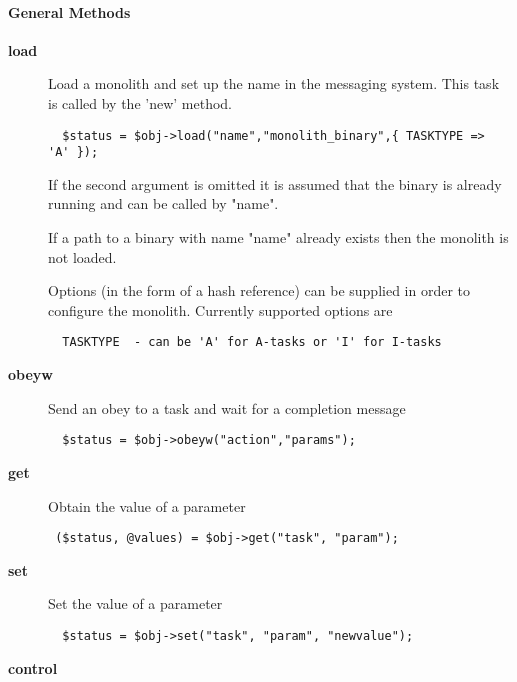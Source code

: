 \paragraph*{General Methods\label{ORAC::Msg::ADAM::Task_General_Methods}}\begin{description}
\item[\textbf{load}] \mbox{}

Load a monolith and set up the name in the messaging system.
This task is called by the 'new' method.

\begin{verbatim}
  $status = $obj->load("name","monolith_binary",{ TASKTYPE => 'A' });
\end{verbatim}


If the second argument is omitted it is assumed that the binary
is already running and can be called by "name".



If a path to a binary with name "name" already exists then the monolith
is not loaded.



Options (in the form of a hash reference) can be supplied
in order to configure the monolith. Currently supported options
are

\begin{verbatim}
  TASKTYPE  - can be 'A' for A-tasks or 'I' for I-tasks
\end{verbatim}
\item[\textbf{obeyw}] \mbox{}

Send an obey to a task and wait for a completion message

\begin{verbatim}
  $status = $obj->obeyw("action","params");
\end{verbatim}
\item[\textbf{get}] \mbox{}

Obtain the value of a parameter

\begin{verbatim}
 ($status, @values) = $obj->get("task", "param");
\end{verbatim}
\item[\textbf{set}] \mbox{}

Set the value of a parameter

\begin{verbatim}
  $status = $obj->set("task", "param", "newvalue");
\end{verbatim}
\item[\textbf{control}] \mbox{}


\end{description}

